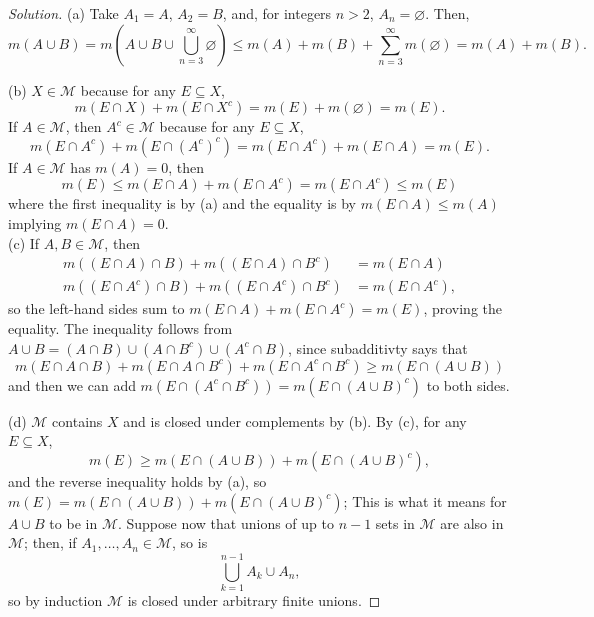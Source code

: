 \documentclass[10pt]{article}
\newenvironment{soln}{\begin{proof}[Solution]}{\end{proof}}
\begin{document}
\begin{soln}
    (a) Take $A_1=A$, $A_2=B$, and, for integers $n>2$, $A_n = \varnothing$.
    Then,
    \begin{equation*}
	m(A\cup B) = m\left(A\cup B\cup \bigcup_{n=3}^\infty \varnothing\right)
	\le m(A) + m(B) + \sum_{n=3}^\infty m(\varnothing)
	= m(A) + m(B).
    \end{equation*}

    (b) $X\in\mathcal M$ because for any $E\subseteq X$,
    \begin{equation*}
	m(E\cap X) + m(E\cap X^c)
	= m(E) + m(\varnothing) = m(E).
    \end{equation*}
    If $A\in\mathcal M$, then $A^c\in\mathcal M$ because
    for any $E\subseteq X$,
    \begin{equation*}
	m(E\cap A^c) + m(E\cap(A^c)^c) = m(E\cap A^c) + m(E\cap A) = m(E).
    \end{equation*}
    If $A\in\mathcal M$ has $m(A) = 0$, then
    \begin{equation*}
        m(E)\le m(E\cap A) + m(E\cap A^c) = m(E\cap A^c) \le m(E)
    \end{equation*}
    where the first inequality is by (a)
    and the equality is by $m(E\cap A)\le m(A)$ implying $m(E\cap A) = 0$.\\

    (c) If $A,B\in\mathcal M$, then
    \begin{align*}
	m((E\cap A)\cap B) + m((E\cap A)\cap B^c) &= m(E\cap A)\\
	m((E\cap A^c)\cap B) + m((E\cap A^c)\cap B^c) &= m(E\cap A^c),
    \end{align*}
    so the left-hand sides sum to
    $m(E\cap A) + m(E\cap A^c) = m(E)$, proving the equality.
    The inequality follows from
    $A\cup B = (A\cap B)\cup(A\cap B^c)\cup(A^c\cap B)$,
    since subadditivty says that
    \begin{equation*}
	m(E\cap A\cap B) + m(E\cap A\cap B^c) + m(E\cap A^c\cap B^c)
	\ge m(E\cap(A\cup B))
    \end{equation*}
    and then we can add $m(E\cap(A^c\cap B^c)) = m(E\cap(A\cup B)^c)$
    to both sides.
    \pagebreak

    (d) $\mathcal M$ contains $X$ and is closed under complements by (b).
    By (c), for any $E\subseteq X$,
    \begin{equation*}
	m(E) \ge m(E\cap(A\cup B)) + m(E\cap(A\cup B)^c),
    \end{equation*}
    and the reverse inequality holds by (a), so
    $m(E) = m(E\cap(A\cup B)) + m(E\cap(A\cup B)^c)$;
    This is what it means for $A\cup B$ to be in $\mathcal M$.
    Suppose now that unions of up to $n-1$ sets in $\mathcal M$
    are also in $\mathcal M$; then, if $A_1,\dots,A_n\in\mathcal M$,
    so is 
    \begin{equation*}
	\bigcup_{k=1}^{n-1} A_k \cup A_n,
    \end{equation*}
    so by induction $\mathcal M$ is closed under arbitrary finite unions.


\end{soln}
\end{document}
